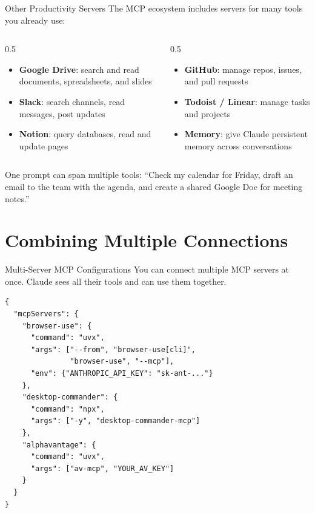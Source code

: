 \documentclass[aspectratio=169]{beamer}
\begin{document}
\begin{frame}{Other Productivity Servers}
The MCP ecosystem includes servers for many tools you already use:
\vspace{0.3cm}
\begin{columns}[T]
\begin{column}{0.5\textwidth}
\begin{itemize}\small
  \item \textbf{Google Drive}: search and read documents, spreadsheets, and slides
  \item \textbf{Slack}: search channels, read messages, post updates
  \item \textbf{Notion}: query databases, read and update pages
\end{itemize}
\end{column}
\begin{column}{0.5\textwidth}
\begin{itemize}\small
  \item \textbf{GitHub}: manage repos, issues, and pull requests
  \item \textbf{Todoist / Linear}: manage tasks and projects
  \item \textbf{Memory}: give Claude persistent memory across conversations
\end{itemize}
\end{column}
\end{columns}
\vspace{0.3cm}
\alert{One prompt can span multiple tools}: ``Check my calendar for Friday, draft an email to the team with the agenda, and create a shared Google Doc for meeting notes.''
\end{frame}

\section{Combining Multiple Connections}

\begin{frame}[fragile,shrink=10]{Multi-Server MCP Configurations}
You can connect multiple MCP servers at once. Claude sees all their tools and can use them together.
\vspace{0.2cm}
\begin{verbatim}
{
  "mcpServers": {
    "browser-use": {
      "command": "uvx",
      "args": ["--from", "browser-use[cli]",
               "browser-use", "--mcp"],
      "env": {"ANTHROPIC_API_KEY": "sk-ant-..."}
    },
    "desktop-commander": {
      "command": "npx",
      "args": ["-y", "desktop-commander-mcp"]
    },
    "alphavantage": {
      "command": "uvx",
      "args": ["av-mcp", "YOUR_AV_KEY"]
    }
  }
}
\end{verbatim}
\end{frame}
\end{document}
